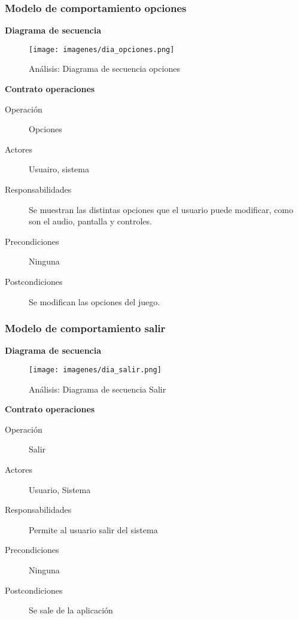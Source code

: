 \subsubsection{Modelo de comportamiento opciones}

\textbf{Diagrama de secuencia}
\begin{figure}[H]
  \label{dia_opciones}
  \begin{center}
    \texttt{[image: imagenes/dia\_opciones.png]}
  \end{center}
  \caption{Análisis: Diagrama de secuencia opciones}
\end{figure}

\textbf{Contrato operaciones}

\begin{description}
    \item[Operación] Opciones
    \item[Actores] Usuairo, sistema
    \item[Responsabilidades] Se muestran las distintas opciones que el usuario puede modificar, como son el audio, pantalla y
    controles.
    \item[Precondiciones] Ninguna
    \item[Postcondiciones] Se modifican las opciones del juego.
\end{description}

\subsubsection{Modelo de comportamiento salir}

\textbf{Diagrama de secuencia}
\begin{figure}[H]
  \label{di_salir}
  \begin{center}
    \texttt{[image: imagenes/dia\_salir.png]}
  \end{center}
  \caption{Análisis: Diagrama de secuencia Salir}
\end{figure}

\textbf{Contrato operaciones}

\begin{description}
    \item[Operación] Salir
    \item[Actores] Usuario, Sistema
    \item[Responsabilidades] Permite al usuario salir del sistema
    \item[Precondiciones] Ninguna
    \item[Postcondiciones] Se sale de la aplicación
\end{description}
